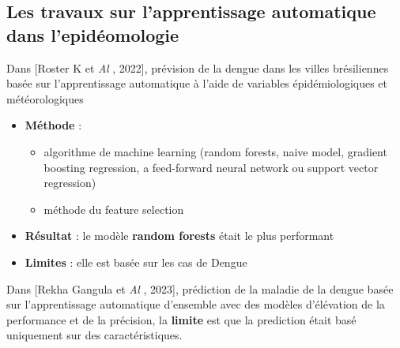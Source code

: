 \subsection*{Les travaux sur l'apprentissage automatique dans l'epidéomologie}
Dans [Roster K et \textit{Al} , 2022], prévision de la dengue dans les villes brésiliennes basée sur l'apprentissage automatique à l'aide de variables épidémiologiques et météorologiques
\begin{itemize}
	\item \textbf{Méthode} :
	\begin{itemize}
		\item algorithme de machine learning (random forests, naive model, gradient boosting regression, a feed-forward neural network ou support vector regression)
		\item méthode du feature selection
	\end{itemize}
	\item \textbf{Résultat} : le modèle \textbf{random forests} était le plus performant
	\item \textbf{Limites} : elle est basée sur les cas de Dengue
\end{itemize}

Dans [Rekha Gangula et \textit{Al} , 2023], prédiction de la maladie de la dengue basée sur l'apprentissage automatique d'ensemble avec des modèles d'élévation de la performance et de la précision, la \textbf{limite} est que la prediction était basé  uniquement sur des caractéristiques.
